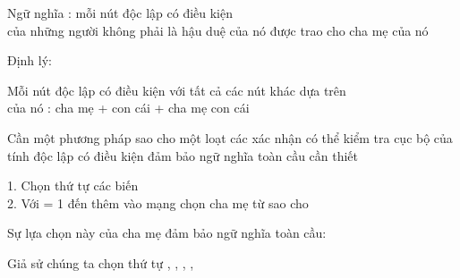 \documentclass{article}
\begin{document}
\begin{huge}

Ngữ nghĩa : mỗi nút độc lập có điều kiện\\
của những người không phải là hậu duệ của nó được trao cho cha mẹ của nó

\vspace*{0.2in}

\textwidth
{}

Định lý:  \mat{$\lequiv$} 




Mỗi nút độc lập có điều kiện với tất cả các nút khác dựa trên \\ của nó
: cha mẹ + con cái + cha mẹ con cái

\vspace*{0.3in}

\textwidth
{}




Cần một phương pháp sao cho một loạt các xác nhận có thể kiểm tra cục bộ của \\
tính độc lập có điều kiện đảm bảo ngữ nghĩa toàn cầu cần thiết

1. Chọn thứ tự các biến \\
2. Với  = 1 đến \al
  thêm  vào mạng \al
  chọn cha mẹ từ  sao cho \nl

Sự lựa chọn này của cha mẹ đảm bảo ngữ nghĩa toàn cầu:


Giả sử chúng ta chọn thứ tự , , , , 


\end{huge}
\end{document}

